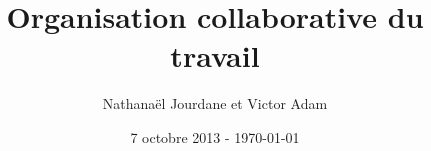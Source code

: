 \documentclass[a4paper,12pt,twoside]{report}
\title{Organisation collaborative du travail}
\author{Nathana{\"e}l Jourdane et Victor Adam}
\date{7 octobre 2013 - \today}
\begin{document}
\maketitle
\newpage \tableofcontents







\printglossaries

\appendix

\end{document}
